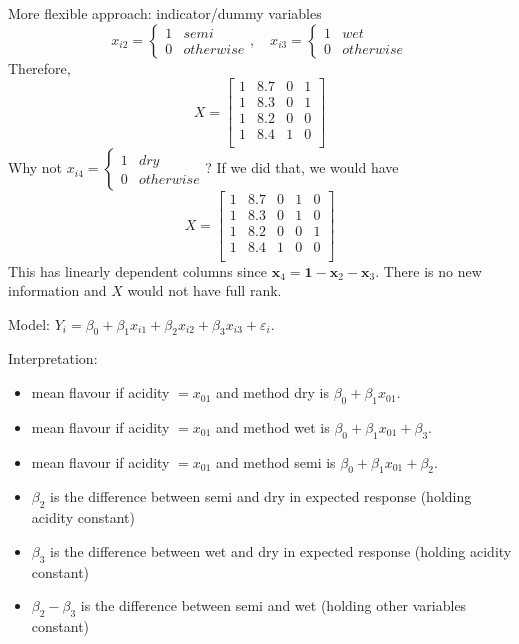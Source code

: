 More flexible approach: indicator/dummy variables
\[ x_{i2}=\begin{cases*}
        1 & semi\\
        0 & otherwise
    \end{cases*},\quad
    x_{i3}=\begin{cases*}
        1 & wet\\
        0 & otherwise
    \end{cases*} \]
Therefore,
\[ X=\begin{bmatrix}
        1 & 8.7 & 0 & 1 \\
        1 & 8.3 & 0 & 1 \\
        1 & 8.2 & 0 & 0 \\
        1 & 8.4 & 1 & 0 \\
    \end{bmatrix} \]
Why not $ x_{i4}=\begin{cases*}
        1 & dry\\
        0 & otherwise
    \end{cases*} $? If we did that, we would have
\[ X=\begin{bmatrix}
        1 & 8.7 & 0 & 1 & 0 \\
        1 & 8.3 & 0 & 1 & 0 \\
        1 & 8.2 & 0 & 0 & 1 \\
        1 & 8.4 & 1 & 0 & 0 \\
    \end{bmatrix} \]
This has linearly dependent columns since
$ \symbf{x}_4=\symbf{1}-\symbf{x}_2-\symbf{x}_3 $.
There is no new information and $ X $
would not have full rank.

Model: $ Y_i=\beta_0+\beta_1x_{i1}+\beta_2x_{i2}+\beta_3x_{i3}+\varepsilon_i $.

Interpretation:
\begin{itemize}
    \item mean flavour if acidity $=x_{01} $
          and method dry is $ \beta_0+\beta_1x_{01} $.
    \item mean flavour if acidity $=x_{01} $
          and method wet is $ \beta_0+\beta_1x_{01}+\beta_3 $.
    \item mean flavour if acidity $=x_{01} $
          and method semi is $ \beta_0+\beta_1x_{01}+\beta_2 $.
    \item $ \beta_2 $ is the difference between
          semi and dry in expected response (holding acidity constant)
    \item $ \beta_3 $ is the difference between
          wet and dry in expected response (holding acidity constant)
    \item $ \beta_2-\beta_3 $ is the difference between
          semi and wet (holding other variables constant)
\end{itemize}

